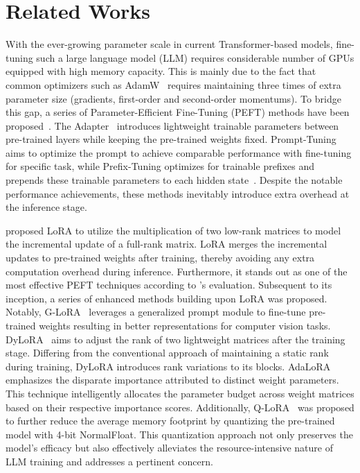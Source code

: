 {\section{Related Works} With the ever-growing parameter scale in current Transformer-based models, fine-tuning such a large language model (LLM) requires considerable number of GPUs equipped with high memory capacity. This is mainly due to the fact that common optimizers such as AdamW~\citep{adamw_loshchilov2017decoupled} requires maintaining three times of extra parameter size (gradients, first-order and second-order momentums). To bridge this gap, a series of Parameter-Efficient Fine-Tuning (PEFT) methods have been proposed~\citep{lora_hu2022lora,p_tuning_liu-etal-2022-p, autoprompt_shin2020autoprompt, adpter_houlsby2019parameter}. The Adapter~\citep{adpter_houlsby2019parameter} introduces lightweight trainable parameters between pre-trained layers while keeping the pre-trained weights fixed. Prompt-Tuning~\citep{prompt_tuning_lester2021power} aims to optimize the prompt to achieve comparable performance with fine-tuning for specific task, while Prefix-Tuning optimizes for trainable prefixes and prepends these trainable parameters to each hidden state~\citep{prefix_tuning_li2021prefix}. Despite the notable performance achievements, these methods inevitably introduce extra overhead at the inference stage. 

\citet{lora_hu2022lora} proposed LoRA to utilize the multiplication of two low-rank matrices to model the incremental update of a full-rank matrix. LoRA merges the incremental updates to pre-trained weights after training, thereby avoiding any extra computation overhead during inference. Furthermore, it stands out as one of the most effective PEFT techniques according to \citet{deltatuning_ding2022delta}'s evaluation. Subsequent to its inception, a series of enhanced methods building upon LoRA was proposed. Notably, G-LoRA~\citep{glora_chavan2023one} leverages a generalized prompt module to fine-tune pre-trained weights resulting in better representations for computer vision tasks. DyLoRA~\citep{dylora_valipour2023dylora} aims to adjust the rank of two lightweight matrices after the training stage. Differing from the conventional approach of maintaining a static rank during training, DyLoRA introduces rank variations to its blocks. AdaLoRA~\citep{adalora_zhang2022adaptive} emphasizes the disparate importance attributed to distinct weight parameters. This technique intelligently allocates the parameter budget across weight matrices based on their respective importance scores. Additionally, Q-LoRA~\citep{qlora_dettmers2023qlora} was proposed to further reduce the average memory footprint by quantizing the pre-trained model with 4-bit NormalFloat. This quantization approach not only preserves the model's efficacy but also effectively alleviates the resource-intensive nature of LLM training and addresses a pertinent concern.

}
